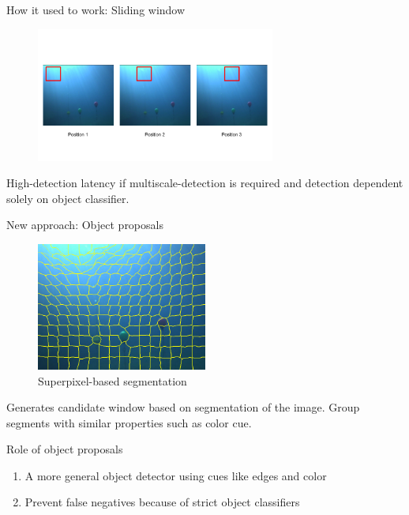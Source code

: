 \documentclass[14pt]{beamer}
\begin{document}
\begin{frame}{How it used to work: Sliding window}

  \begin{figure}[ht]
      \centering
      \includegraphics[width=0.7\textwidth, height=0.4\textwidth]{figs/sliding_window.png}
  \end{figure}

  High-detection latency if multiscale-detection is required and detection dependent solely
  on object classifier.
\end{frame}

\begin{frame}{New approach: Object proposals}

  \begin{figure}[ht]
      \centering
      \includegraphics[width=0.5\textwidth, height=0.3\textwidth]{figs/slic.png}
      \caption{Superpixel-based segmentation}
  \end{figure}

  Generates candidate window based on segmentation of the image. Group segments
  with similar properties such as color cue.
\end{frame}

\begin{frame}{Role of object proposals}

  \begin{enumerate}
    \item A more general object detector using cues like edges and color
    \item Prevent false negatives because of strict object classifiers
  \end{enumerate}
\end{frame}
\end{document}
